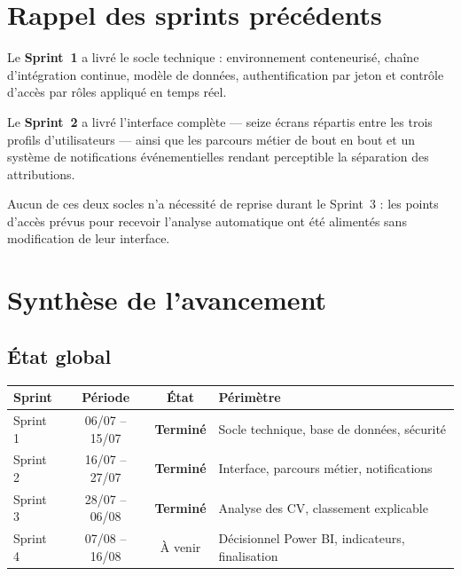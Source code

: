 \documentclass[11pt,a4paper]{article}
\begin{document}
\section{Rappel des sprints précédents}
Le \textbf{Sprint~1} a livré le socle technique : environnement conteneurisé, chaîne d'intégration continue, modèle de données, authentification par jeton et contrôle d'accès par rôles appliqué en temps réel.

Le \textbf{Sprint~2} a livré l'interface complète — seize écrans répartis entre les trois profils d'utilisateurs — ainsi que les parcours métier de bout en bout et un système de notifications événementielles rendant perceptible la séparation des attributions.

Aucun de ces deux socles n'a nécessité de reprise durant le Sprint~3 : les points d'accès prévus pour recevoir l'analyse automatique ont été alimentés sans modification de leur interface.

\section{Synthèse de l'avancement}

\subsection{État global}

\begin{center}
\small
\begin{tabular}{lccp{5.4cm}}
  \toprule
  \textbf{Sprint} & \textbf{Période} & \textbf{État} & \textbf{Périmètre} \\
  \midrule
  Sprint 1 & 06/07 -- 15/07 & \textcolor{vert}{\textbf{Terminé}} & Socle technique, base de données, sécurité \\[1mm]
  Sprint 2 & 16/07 -- 27/07 & \textcolor{vert}{\textbf{Terminé}} & Interface, parcours métier, notifications \\[1mm]
  Sprint 3 & 28/07 -- 06/08 & \textcolor{vert}{\textbf{Terminé}} & Analyse des CV, classement explicable \\[1mm]
  Sprint 4 & 07/08 -- 16/08 & \textcolor{accent}{À venir} & Décisionnel Power BI, indicateurs, finalisation \\
  \bottomrule
\end{tabular}
\end{center}
\end{document}
